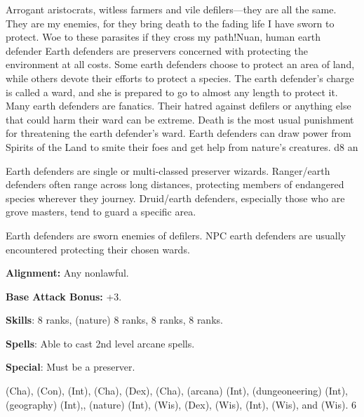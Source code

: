 {Arrogant aristocrats, witless farmers and vile defilers---they are all the same. They are my enemies, for they bring death to the fading life I have sworn to protect. Woe to these parasites if they cross my path!}{Nuan, human earth defender}
{Earth defenders are preservers concerned with protecting the environment at all costs. Some earth defenders choose to protect an area of land, while others devote their efforts to protect a species. The earth defender's charge is called a ward, and she is prepared to go to almost any length to protect it. Many earth defenders are fanatics. Their hatred against defilers or anything else that could harm their ward can be extreme. Death is the most usual punishment for threatening the earth defender's ward. Earth defenders can draw power from Spirits of the Land to smite their foes and get help from nature's creatures.}
{d8}
{an}
{
Earth defenders are single or multi-classed preserver wizards. Ranger/earth defenders often range across long distances, protecting members of endangered species wherever they journey. Druid/earth defenders, especially those who are grove masters, tend to guard a specific area.

Earth defenders are sworn enemies of defilers. NPC earth defenders are usually encountered protecting their chosen wards.
}
{
\textbf{Alignment:} Any nonlawful.

\textbf{Base Attack Bonus:} +3.

\textbf{Skills}:  8 ranks,  (nature) 8 ranks,  8 ranks,  8 ranks.

\textbf{Spells}: Able to cast 2nd level arcane spells.

\textbf{Special}: Must be a preserver.
}
{ (Cha),  (Con),  (Int),  (Cha),  (Dex),  (Cha),  (arcana) (Int),  (dungeoneering) (Int),  (geography) (Int),,  (nature) (Int),  (Wis),  (Dex),  (Wis),  (Int),  (Wis), and  (Wis).}
{6}
